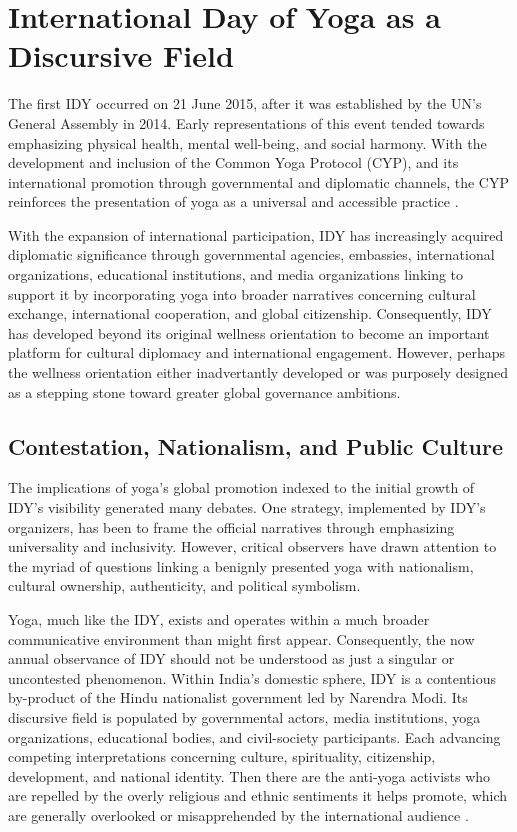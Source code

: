 \documentclass[11pt]{article}
\begin{document}
\section{International Day of Yoga as a Discursive Field}

The first IDY occurred on 21 June 2015, after it was established by the UN's General Assembly in 2014. Early representations of this event tended towards emphasizing physical health, mental well-being, and social harmony. With the development and inclusion of the Common Yoga Protocol (CYP), and its international promotion through governmental and diplomatic channels, the CYP reinforces the presentation of yoga as a universal and accessible practice \cite{indiandiplomacy2017}.

With the expansion of international participation, IDY has increasingly acquired diplomatic significance through governmental agencies, embassies, international organizations, educational institutions, and media organizations linking to support it by incorporating yoga into broader narratives concerning cultural exchange, international cooperation, and global citizenship. Consequently, IDY has developed beyond its original wellness orientation to become an important platform for cultural diplomacy and international engagement. However, perhaps the wellness orientation either inadvertantly developed or was purposely designed as a stepping stone toward greater global governance ambitions.

\subsection{Contestation, Nationalism, and Public Culture}
The implications of yoga's global promotion indexed to the initial growth of IDY's visibility generated many debates. One strategy, implemented by IDY's organizers, has been to frame the official narratives through emphasizing universality and inclusivity. However, critical observers have drawn attention to the myriad of questions linking a benignly presented yoga with  nationalism, cultural ownership, authenticity, and political symbolism.

Yoga, much like the IDY, exists and operates within a much broader communicative environment than might first appear. Consequently, the now annual observance of IDY should not be understood as just a singular or uncontested phenomenon. Within India's domestic sphere, IDY is a contentious by-product of the Hindu nationalist government led by Narendra Modi. Its discursive field is populated by governmental actors, media institutions, yoga organizations, educational bodies, and civil-society participants. Each advancing competing interpretations concerning culture, spirituality, citizenship, development, and national identity. Then there are the anti-yoga activists who are repelled by the overly religious and ethnic sentiments it helps promote, which are generally overlooked or misapprehended by the international audience \cite{merkel2015,otto2025,chandra2026}.
\end{document}
